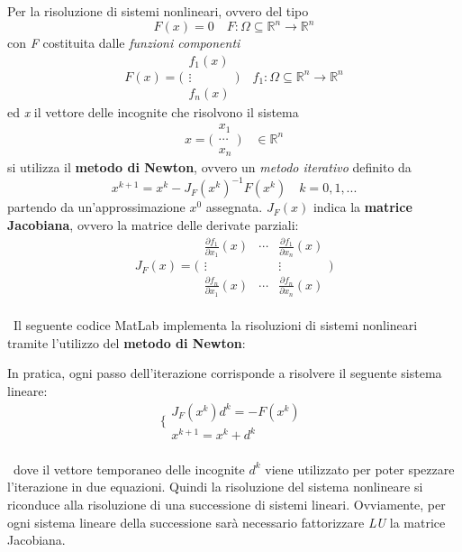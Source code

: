 Per la risoluzione di sistemi nonlineari, ovvero del tipo 
	\[
	F(x)=0 \quad F: \Omega \subseteq \mathbb{R}^n \rightarrow \mathbb{R}^n
	\]
con \textit{F} costituita dalle \textit{funzioni componenti}
	\[
	F(x)=\Bigg(\begin{matrix}
		f_1(x) \\
		\vdots \\
		f_n(x)
	\end{matrix}\Bigg) \quad
	f_1: \Omega \subseteq \mathbb{R}^n \rightarrow \mathbb{R}^n
	\]
ed \textit{x} il vettore delle incognite che risolvono il sistema 
	\[
	x=\Bigg(\begin{matrix}
		x_1 	\\
		\cdots  \\
		x_n
	\end{matrix}\Bigg) \quad
	\in \mathbb{R}^n	
	\]
si utilizza il \textbf{metodo di Newton}, ovvero un \textit{metodo iterativo} definito da
	\[
	x^{k+1}=x^k - J_F(x^k)^{-1}F(x^k) \quad k=0,1,...
	\]
partendo da un'approssimazione $x^0$ assegnata. $J_F(x)$ indica la \textbf{matrice Jacobiana}, ovvero la matrice delle derivate parziali:
	\[
	J_F(x)=\Bigg(\begin{matrix}
		\frac{\partial f_1}{\partial x_1}(x) & \cdots & \frac{\partial f_1}{\partial x_n}(x) \\
		\vdots & & \vdots \\
		\frac{\partial f_n}{\partial x_1}(x) & \cdots & \frac{\partial f_n}{\partial x_n}(x) 
	\end{matrix}\Bigg)
	\]\\\
Il seguente codice MatLab implementa la risoluzioni di sistemi nonlineari tramite l'utilizzo del \textbf{metodo di Newton}:
	
In pratica, ogni passo dell'iterazione corrisponde a risolvere il seguente sistema lineare:
	\[
	\Bigg\{\begin{matrix}
		J_F(x^k)d^k = -F(x^k) \\
		x^{k+1} = x^k + d^k
	\end{matrix}\
	\]\\\
dove il vettore temporaneo delle incognite $d^k$ viene utilizzato per poter spezzare l'iterazione in due equazioni. Quindi la risoluzione del sistema nonlineare si riconduce alla risoluzione di una successione di sistemi lineari. Ovviamente, per ogni sistema lineare della successione sarà necessario fattorizzare \textit{LU} la matrice Jacobiana.